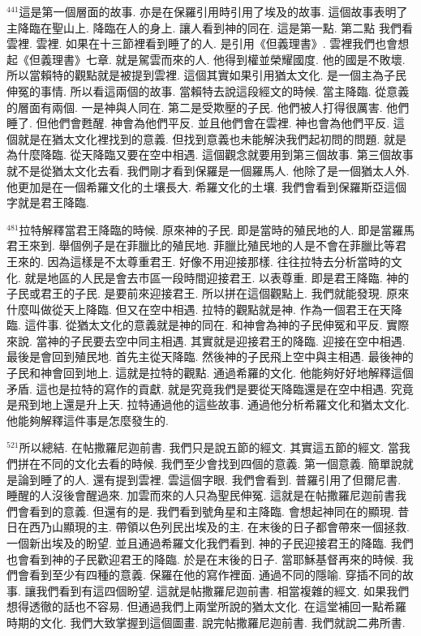 \documentclass{book}
\begin{document}
$^{441}$這是第一個層面的故事.
亦是在保羅引用時引用了埃及的故事.
這個故事表明了主降臨在聖山上.
降臨在人的身上.
讓人看到神的同在.
這是第一點.
第二點 我們看雲裡.
雲裡.
如果在十三節裡看到睡了的人.
是引用《但義理書》.
雲裡我們也會想起《但義理書》七章.
就是駕雲而來的人.
他得到權並榮耀國度.
他的國是不敗壞.
所以當賴特的觀點就是被提到雲裡.
這個其實如果引用猶太文化.
是一個主為子民伸冤的事情.
所以看這兩個的故事.
當賴特去說這段經文的時候.
當主降臨.
從意義的層面有兩個.
一是神與人同在.
第二是受欺壓的子民.
他們被人打得很厲害.
他們睡了.
但他們會甦醒.
神會為他們平反.
並且他們會在雲裡.
神也會為他們平反.
這個就是在猶太文化裡找到的意義.
但找到意義也未能解決我們起初問的問題.
就是為什麼降臨.
從天降臨又要在空中相遇.
這個觀念就要用到第三個故事.
第三個故事就不是從猶太文化去看.
我們剛才看到保羅是一個羅馬人.
他除了是一個猶太人外.
他更加是在一個希羅文化的土壤長大.
希羅文化的土壤.
我們會看到保羅斯亞這個字就是君王降臨.

$^{481}$拉特解釋當君王降臨的時候.
原來神的子民.
即是當時的殖民地的人.
即是當羅馬君王來到.
舉個例子是在菲臘比的殖民地.
菲臘比殖民地的人是不會在菲臘比等君王來的.
因為這樣是不太尊重君王.
好像不用迎接那樣.
往往拉特去分析當時的文化.
就是地區的人民是會去市區一段時間迎接君王.
以表尊重.
即是君王降臨.
神的子民或君王的子民.
是要前來迎接君王.
所以拼在這個觀點上.
我們就能發現.
原來什麼叫做從天上降臨.
但又在空中相遇.
拉特的觀點就是神.
作為一個君王在天降臨.
這件事.
從猶太文化的意義就是神的同在.
和神會為神的子民伸冤和平反.
實際來說.
當神的子民要去空中同主相遇.
其實就是迎接君王的降臨.
迎接在空中相遇.
最後是會回到殖民地.
首先主從天降臨.
然後神的子民飛上空中與主相遇.
最後神的子民和神會回到地上.
這就是拉特的觀點.
通過希羅的文化.
他能夠好好地解釋這個矛盾.
這也是拉特的寫作的貢獻.
就是究竟我們是要從天降臨還是在空中相遇.
究竟是飛到地上還是升上天.
拉特通過他的這些故事.
通過他分析希羅文化和猶太文化.
他能夠解釋這件事是怎麼發生的.

$^{521}$所以總結.
在帖撒羅尼迦前書.
我們只是說五節的經文.
其實這五節的經文.
當我們拼在不同的文化去看的時候.
我們至少會找到四個的意義.
第一個意義.
簡單說就是論到睡了的人.
還有提到雲裡.
雲這個字眼.
我們會看到.
普羅引用了但爾尼書.
睡醒的人沒後會醒過來.
加雲而來的人只為聖民伸冤.
這就是在帖撒羅尼迦前書我們會看到的意義.
但還有的是.
我們看到號角星和主降臨.
會想起神同在的顯現.
昔日在西乃山顯現的主.
帶領以色列民出埃及的主.
在末後的日子都會帶來一個拯救.
一個新出埃及的盼望.
並且通過希羅文化我們看到.
神的子民迎接君王的降臨.
我們也會看到神的子民歡迎君王的降臨.
於是在末後的日子.
當耶穌基督再來的時候.
我們會看到至少有四種的意義.
保羅在他的寫作裡面.
通過不同的隱喻.
穿插不同的故事.
讓我們看到有這四個盼望.
這就是帖撒羅尼迦前書.
相當複雜的經文.
如果我們想得透徹的話也不容易.
但通過我們上兩堂所說的猶太文化.
在這堂補回一點希羅時期的文化.
我們大致掌握到這個圖畫.
說完帖撒羅尼迦前書.
我們就說二弗所書.
\end{document}
